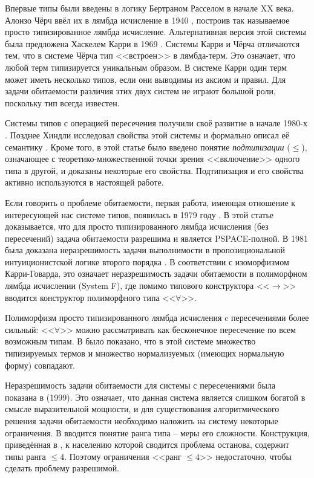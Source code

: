 \documentclass[../main.tex]{subfiles}
\begin{document}
Впервые типы были введены в логику Бертраном Расселом в начале XX века. Алонзо Чёрч ввёл их в лямбда исчисление в 1940 \cite{church_1940}, построив так называемое просто типизированное лямбда исчисление. Альтернативная версия этой системы была предложена Хаскелем Карри в 1969 \cite{curry_1969}. Системы Карри и Чёрча отличаются тем, что в системе Чёрча тип <<встроен>> в лямбда-терм. Это означает, что любой терм типизируется уникальным образом. В системе Карри один терм может иметь несколько типов, если они выводимы из аксиом и правил. Для задачи обитаемости различия этих двух систем не играют большой роли, поскольку тип всегда известен.

Системы типов с операцией пересечения получили своё развитие в начале 1980-х \cite{coppo_1980, coppo_1981}. Позднее Хиндли исследовал свойства этой системы и формально описал её семантику \cite{hindley_1982}. Кроме того, в этой статье было введено понятие {\it подтипизации} ($\leqslant$), означающее с теоретико-множественной точки зрения <<включение>> одного типа в другой, и доказаны некоторые его свойства. Подтипизация и его свойства активно используются в настоящей работе. 

Если говорить о проблеме обитаемости, первая работа, имеющая отношение к интересующей нас системе типов, появилась в 1979 году \cite{statman_1979}. В этой статье доказывается, что для просто типизированного лямбда исчисления (без пересечений) задача обитаемости разрешима и является PSPACE-полной. В 1981 была доказана неразрешимость задачи выполнимости в пропозициональной интуиционистской логике второго порядка \cite{gabbay_1981}. В соответствии с изоморфизмом Карри-Говарда, это означает неразрешимость задачи обитаемости в полиморфном лямбда исчислении (System F), где помимо типового конструктора <<$\to$>> вводится конструктор полиморфного типа <<$\forall$>>.

Полиморфизм просто типизированного лямбда исчисления c пересечениями более сильный: <<$\forall$>> можно рассматривать как бесконечное пересечение по всем возможным типам. В \cite{pottinger_1980} было показано, что в этой системе множество типизируемых термов и множество нормализуемых (имеющих нормальную форму) совпадают. 

Неразрешимость задачи обитаемости для системы с пересечениями была показана в \cite{urzyczyn_1999} (1999). %
Это означает, что данная система является слишком богатой в смысле выразительной мощности, и для существования алгоритмического решения задачи обитаемости необходимо наложить на систему некоторые ограничения. В \cite{leivant_1983} вводится понятие ранга типа -- меры его сложности. Конструкция, приведённая в \cite{urzyczyn_1999}, к населению которой сводится проблема останова, содержит типы ранга $\leqslant 4$. Поэтому ограничения <<ранг $\leqslant 4$>> недостаточно, чтобы сделать проблему разрешимой. 
\end{document}
